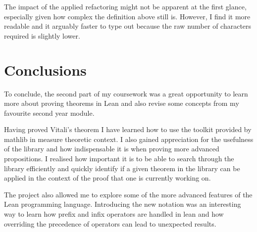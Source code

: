 \documentclass[11pt]{article}
\begin{document}
The impact of the applied refactoring might not be apparent at the first glance,
especially given how complex the definition above still is. However, I find it
more readable and it arguably faster to type out because the
raw number of characters required is slightly lower.

\section*{Conclusions}

To conclude, the second part of my coursework was a great opportunity to learn
more about proving theorems in Lean and also revise some concepts from my
favourite second year module.

Having proved Vitali's theorem I have learned
how to use the toolkit provided by mathlib in measure theoretic context. I also
gained appreciation for the usefulness of the library and how indispensable it
is when proving more advanced propositions. I realised how important it is to be
able to search through the library efficiently and quickly identify if a given
theorem in the library can be applied in the context of the proof that one is
currently working on.

The project also allowed me to explore some of the more advanced features of the
Lean programming language. Introducing the new notation was an interesting way to
learn how prefix and infix operators are handled in lean and how overriding the precedence of
operators can lead to unexpected results.


\begin{comment}

-- Good example of notation refactoring

\end{comment}
\end{document}
